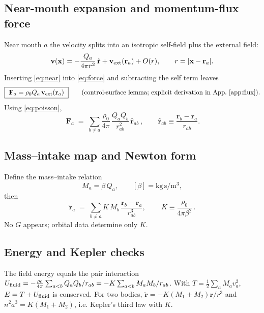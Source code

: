 \documentclass[11pt]{article}
\numberwithin{equation}{section}
\theoremstyle{plain}
\theoremstyle{remark}
\theoremstyle{definition}
\begin{document}
\subsection{Near-mouth expansion and momentum-flux force}
Near mouth $a$ the velocity splits into an isotropic self-field plus the external field:
\begin{equation}
\mathbf v(\mathbf x)= -\frac{Q_a}{4\pi r^2}\,\hat{\mathbf r}+\mathbf v_{\rm ext}(\mathbf r_a)+O(r),\qquad
r=|\mathbf x-\mathbf r_a|.
\label{eq:near}
\end{equation}
Inserting \eqref{eq:near} into \eqref{eq:force} and subtracting the self term leaves
\begin{equation}
\boxed{\ \mathbf F_a = \rho_0 Q_a\,\mathbf v_{\rm ext}(\mathbf r_a)\ }\qquad\text{(control-surface lemma; explicit derivation in App.~\ref{app:flux}).}
\label{eq:controlsurface}
\end{equation}
Using \eqref{eq:poisson},
\begin{equation}
\boxed{\ \mathbf F_a \;=\; \sum_{b\neq a} \frac{\rho_0}{4\pi}\,\frac{Q_a Q_b}{r_{ab}^2}\,\hat{\mathbf r}_{ab}\ },
\qquad \hat{\mathbf r}_{ab}\equiv\frac{\mathbf r_b-\mathbf r_a}{r_{ab}}.
\label{eq:pair_force}
\end{equation}

\subsection{Mass--intake map and Newton form}
Define the mass--intake relation
\begin{equation}
M_a=\beta\,Q_a, \qquad [\beta]=\mathrm{kg\,s/m^3},
\label{eq:massmap}
\end{equation}
then
\begin{equation}
\ddot{\mathbf r}_a \;=\; \sum_{b\neq a} K\,M_b\,\frac{\mathbf r_{b}-\mathbf r_{a}}{r_{ab}^3},
\qquad \boxed{\,K\equiv \frac{\rho_0}{4\pi\beta^2}\,}.
\label{eq:newton_form}
\end{equation}
No $G$ appears; orbital data determine only $K$.

\subsection{Energy and Kepler checks}
The field energy equals the pair interaction $U_{\rm fluid}=-\frac{\rho_0}{4\pi}\sum_{a<b}Q_aQ_b/r_{ab}=-K\sum_{a<b}M_aM_b/r_{ab}$. With $T=\tfrac12\sum_a M_a v_a^2$, $E=T+U_{\rm fluid}$ is conserved. For two bodies, $\ddot{\mathbf r}=-K(M_1+M_2)\mathbf r/r^3$ and $n^2 a^3=K(M_1+M_2)$, i.e. Kepler’s third law with $K$.
\end{document}
